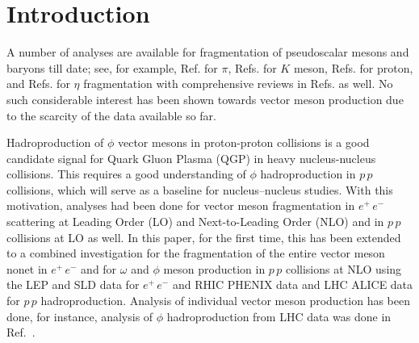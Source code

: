 \documentclass{ws-ijmpa}
\def\om{{\omega}}
\begin{document}

\maketitle

\section{Introduction}
A number of analyses are available for fragmentation of
pseudoscalar mesons and baryons till date; see, for example,
Ref.\cite{Kret} for $\pi$, 
Refs.\cite{Indu,Misra,Albino1,Albino2,Albino3,Kumano1,Kumano2,Strat} 
for $K$ meson,
Refs.\cite{Hirai,Flor} for proton, and Refs.\cite{Misra,Stratmann}
for $\eta$ fragmentation with comprehensive reviews in
Refs.\cite{Albino1,Albino2,Albino3,Ams} as well. No such considerable
interest has been shown towards vector meson production due to the
scarcity of the data available so far.

Hadroproduction of $\phi$ vector mesons in proton-proton collisions
is a good candidate signal for Quark Gluon Plasma (QGP) in heavy
nucleus-nucleus collisions. This requires a good understanding of $\phi$
hadroproduction in $p\,p$ collisions, which will serve as a baseline
for nucleus--nucleus studies. With this motivation, analyses had been
done for vector meson fragmentation in $e^+\,e^-$ scattering at Leading
Order (LO)\cite{Savilo} and Next-to-Leading Order (NLO)\cite{Savinlo}
and in $p\,p$ collisions at LO\cite{Savilo} as well. In this paper,
for the first time, this has been extended to a combined investigation
for the fragmentation of the entire vector meson nonet in $e^+\,e^-$ and
for $\om$ and $\phi$ meson production in $p\,p$ collisions at NLO using
the LEP\cite{Data,Rho1,Rho2,Rho3,Rho5,Omega1,Omega2} and
SLD\cite{SLD1,SLD2} data for $e^+\,e^-$
and RHIC PHENIX\cite{RHIC} data and LHC ALICE\cite{LHC-17} data for
$p\,p$ hadroproduction. Analysis of individual vector meson production
has been done, for instance, analysis of $\phi$ hadroproduction from
LHC data was done in Ref.~\cite{Wei}.
\end{document}

